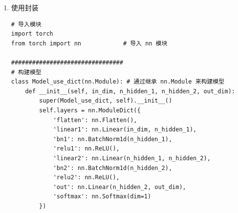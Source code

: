 \begin{enumerate}[label=\arabic*)]
\begin{lstlisting}[style=pythonstyle]
################################
# 构建模型
class Model_use_modlist(nn.Module): # 通过继承 nn.Module 来构建模型
    def __init__(self, in_dim, n_hidden_1, n_hidden_2, out_dim):
        super(Model_use_modlist, self).__init__()
        self.layers = nn.ModuleList([nn.Flatten(), 
                                     nn.Linear(in_dim, n_hidden_1),
                                     nn.BatchNorm1d(n_hidden_1),
                                     nn.ReLU(),
                                     nn.Linear(n_hidden_1, n_hidden_2),
                                     nn.BatchNorm1d(n_hidden_2),
                                     nn.ReLU(),
                                     nn.Linear(n_hidden_2, out_dim),
                                     nn.Softmax(dim=1)])

    def forward(self, x):
        for layer in self.layers:
            x = layer(x)
        return x

# 查看模型
# 定义一个28*28的输入，
# 第一个隐藏层300个神经元，第二个隐藏层100个神经元，
# 输出层10个神经元
in_dim, n_hidden_1, n_hidden_2, out_dim = 28*28, 300, 100, 10
model = Model_use_modlist(in_dim, n_hidden_1, n_hidden_2, out_dim)
print(model)    
\end{lstlisting}
\begin{lstlisting}[style=demostyle,numbers=none]
Model_use_modlist(
  (layers): ModuleList(
    (0): Flatten(start_dim=1, end_dim=-1)
    (1): Linear(in_features=784, out_features=300, bias=True)
    (2): BatchNorm1d(300, eps=1e-05, momentum=0.1, affine=True, track_running_stats=True)
    (3): ReLU()
    (4): Linear(in_features=300, out_features=100, bias=True)
    (5): BatchNorm1d(100, eps=1e-05, momentum=0.1, affine=True, track_running_stats=True)
    (6): ReLU()
    (7): Linear(in_features=100, out_features=10, bias=True)
    (8): Softmax(dim=1)
  )
)
\end{lstlisting}

    \item 使用封装
\begin{lstlisting}[style=pythonstyle]
# 导入模块
import torch
from torch import nn            # 导入 nn 模块

################################
# 构建模型
class Model_use_dict(nn.Module): # 通过继承 nn.Module 来构建模型
    def __init__(self, in_dim, n_hidden_1, n_hidden_2, out_dim):
        super(Model_use_dict, self).__init__()
        self.layers = nn.ModuleDict({
            'flatten': nn.Flatten(),
            'linear1': nn.Linear(in_dim, n_hidden_1),
            'bn1': nn.BatchNorm1d(n_hidden_1),
            'relu1': nn.ReLU(),
            'linear2': nn.Linear(n_hidden_1, n_hidden_2),
            'bn2': nn.BatchNorm1d(n_hidden_2),
            'relu2': nn.ReLU(),
            'out': nn.Linear(n_hidden_2, out_dim),
            'softmax': nn.Softmax(dim=1)
        })


\end{lstlisting}
\end{enumerate}
